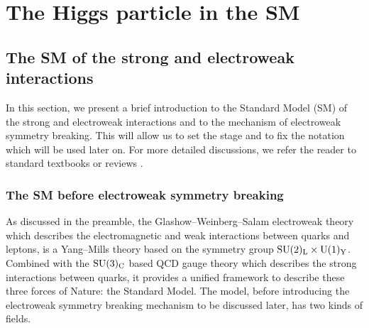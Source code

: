 \setcounter{equation}{0}
\renewcommand{\theequation}{1.\arabic{equation}}


\section{The Higgs particle in the SM}
\subsection{The SM of the strong and electroweak interactions} 

In this section, we present a brief introduction to the Standard Model (SM)
of the strong and electroweak interactions and to the mechanism of electroweak 
symmetry breaking. This will allow us to set the stage and to fix the notation 
which will be used later on. For more detailed discussions, we refer the reader
to standard textbooks \cite{BOOKS} or reviews \cite{SM-REVIEWS}.

\subsubsection{The SM before electroweak symmetry breaking} 

As discussed in the preamble, the Glashow--Weinberg--Salam electroweak theory
\cite{GSW} which describes the electromagnetic and weak interactions between
quarks and leptons, is a Yang--Mills theory \cite{Yang-Mills} based on the
symmetry group ${\rm SU(2)_L \times U(1)_Y}$. Combined with the ${\rm SU(3)_C}$
based QCD gauge theory \cite{QCD} which describes the strong interactions
between quarks, it provides a unified framework to describe these three forces
of Nature: the Standard Model. The model, before introducing the electroweak
symmetry breaking mechanism to be discussed later, has two kinds of fields. \s

